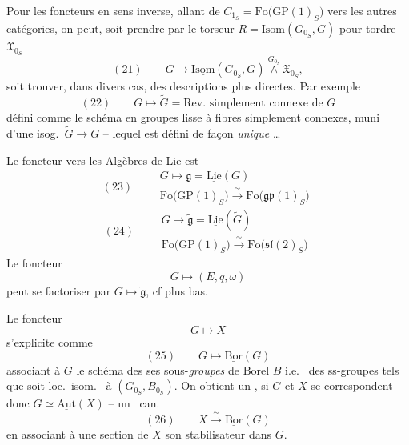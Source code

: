 \documentclass[11pt,a4paper]{article}
\begin{document}
Pour les foncteurs en sens inverse, allant de $C_{1_S} = \mathrm{Fo}\bigl(\mathrm{GP}(1)_S\bigr)$
vers les autres catégories, on peut, soit prendre par le torseur
$R = \underline{\mathrm{Isom}}(G_{0_S}, G)$ pour tordre $\mathfrak{X}_{0_S}$
\[
  (21) \qquad G \longmapsto \underline{\mathrm{Isom}}(G_{0_S}, G) \overset{G_{0_S}}{\wedge} \mathfrak{X}_{0_S} ,
\]
soit trouver, dans divers cas, des descriptions plus directes. Par exemple
\[
  (22) \qquad G \longmapsto \widetilde{G} = \text{Rev.\ simplement connexe de } G
\]
défini comme le schéma en groupes lisse à fibres \struck{\ill{}}  simplement connexes, muni d'une isog.\ $\widetilde{G} \to G$ -- lequel est défini de façon \emph{unique} \ldots

Le foncteur vers les Algèbres de Lie est
\[
  (23) \qquad \begin{array}{c}
    G \longmapsto \mathfrak{g} = \underline{\mathrm{Lie}}(G) \\
    \mathrm{Fo}\bigl(\mathrm{GP}(1)_S\bigr) \xrightarrow{\ \sim\ } \mathrm{Fo}\bigl(\mathfrak{gp}(1)_S\bigr)
  \end{array}
\]
\[
  (24) \qquad \begin{array}{c}
    G \longmapsto \widetilde{\mathfrak{g}} = \underline{\mathrm{Lie}}(\widetilde{G}) \\
    \mathrm{Fo}\bigl(\mathrm{GP}(1)_S\bigr) \xrightarrow{\ \sim\ } \mathrm{Fo}\bigl(\mathfrak{sl}(2)_S\bigr)
  \end{array}
\]
Le foncteur
\[
  G \longmapsto (E, q, \omega)
\]
peut se factoriser par $G \mapsto \widetilde{\mathfrak{g}}$, cf plus bas.

Le foncteur
\[
  G \longmapsto X
\]
s'explicite comme
\[
  (25) \qquad G \longmapsto \underline{\mathrm{Bor}}(G)
\]
associant à $G$ le \struck{\ill{}} schéma des ses sous-\emph{groupes} de Borel $B$
i.e.\ \struck{\ill{}} des ss-groupes tels que   soit
loc.\ isom.\ \struck{\ill{}} à $(G_{0_S}, B_{0_S})$. On obtient un ,
si $G$ et $X$ se correspondent -- donc $G \simeq \underline{\mathrm{Aut}}(X)$ -- un
\ can.
\[
  (26) \qquad X \xrightarrow{\ \sim\ } \underline{\mathrm{Bor}}(G)
\]
en associant à une section  de $X$ son stabilisateur dans $G$.
\end{document}
